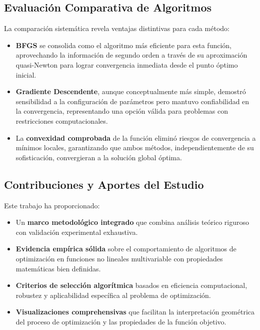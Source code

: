 \documentclass[11pt, a4paper, twocolumn]{beamer}
\begin{document}
		\subsection{Evaluación Comparativa de Algoritmos}
		
		La comparación sistemática revela ventajas distintivas para cada método:
		
		\begin{itemize}
			\item \textbf{BFGS} se consolida como el algoritmo más eficiente para esta función, aprovechando la información de segundo orden a través de su aproximación quasi-Newton para lograr convergencia inmediata desde el punto óptimo inicial.
			
			\item \textbf{Gradiente Descendente}, aunque conceptualmente más simple, demostró sensibilidad a la configuración de parámetros pero mantuvo confiabilidad en la convergencia, representando una opción válida para problemas con restricciones computacionales.
			
			\item La \textbf{convexidad comprobada} de la función eliminó riesgos de convergencia a mínimos locales, garantizando que ambos métodos, independientemente de su sofisticación, convergieran a la solución global óptima.
		\end{itemize}
		
		\subsection{Contribuciones y Aportes del Estudio}
		
		Este trabajo ha proporcionado:
		
		\begin{itemize}
			\item Un \textbf{marco metodológico integrado} que combina análisis teórico riguroso con validación experimental exhaustiva.
			
			\item \textbf{Evidencia empírica sólida} sobre el comportamiento de algoritmos de optimización en funciones no lineales multivariable con propiedades matemáticas bien definidas.
			
			\item \textbf{Criterios de selección algorítmica} basados en eficiencia computacional, robustez y aplicabilidad específica al problema de optimización.
			
			\item \textbf{Visualizaciones comprehensivas} que facilitan la interpretación geométrica del proceso de optimización y las propiedades de la función objetivo.
		\end{itemize}
		
\end{document}
